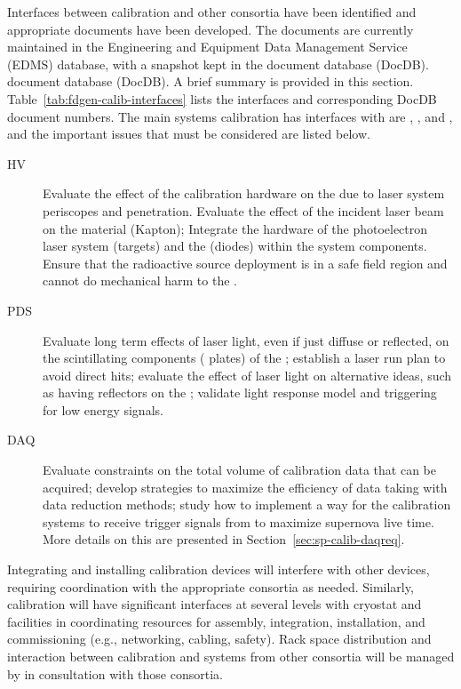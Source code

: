 
Interfaces between calibration and other consortia have been identified and appropriate documents have been developed. %
The documents are currently maintained in the  Engineering and Equipment Data Management Service (EDMS) database, with a  snapshot kept in the  document database (DocDB).
 document database (DocDB). 
A brief summary is provided in this section. Table~\ref{tab:fdgen-calib-interfaces} lists the interfaces and corresponding DocDB document numbers. 
The main systems calibration has interfaces with are , , and , and the important issues that must be considered are listed below.

\begin{description}
    \item[HV] Evaluate the effect of the calibration hardware on the \efield due to laser system periscopes and  penetration. 
    Evaluate the effect of the incident laser beam on the  material (Kapton); Integrate the hardware of the %
    photoelectron laser system (targets) and the  (diodes) within the  system components. Ensure that the radioactive source deployment is in a safe field region and cannot do mechanical harm to the .
    \item[PDS] Evaluate long term effects of laser light, even if just diffuse or reflected, on the scintillating components ( plates) of the ; establish a laser run plan to avoid direct hits; evaluate the effect of laser light on alternative  ideas, such as having reflectors on the ; validate light response model and triggering for low energy signals. 
    \item[DAQ] Evaluate  constraints on the total volume of calibration data that can be acquired; develop strategies to maximize the efficiency of data taking with data reduction methods; study how to implement a way for the calibration systems to receive trigger signals from  to maximize supernova live time. More details on this are presented in Section~\ref{sec:sp-calib-daqreq}.
\end{description}

Integrating and installing calibration devices will interfere with other devices, requiring coordination with the appropriate consortia as needed. Similarly, calibration will have significant interfaces at several levels with cryostat and facilities in coordinating resources for assembly, integration, installation, and commissioning (e.g., networking, cabling, safety). Rack space distribution and interaction between calibration and systems from other consortia will be managed by  in consultation with those consortia.

